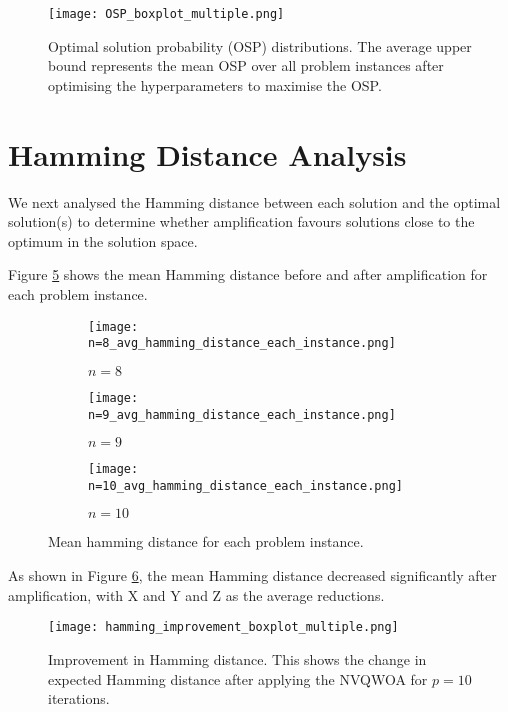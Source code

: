 \begin{figure}[htbp]
    \centering
    \texttt{[image: OSP\_boxplot\_multiple.png]} 
    \caption{Optimal solution probability (OSP) distributions. The average upper bound represents the mean OSP over all problem instances after optimising the hyperparameters to maximise the OSP.}
    \label{fig:osp}
\end{figure}



\section{Hamming Distance Analysis}
We next analysed the Hamming distance between each solution and the optimal solution(s) to determine whether amplification favours solutions close to the optimum in the solution space.

Figure \ref{fig:avg ham} shows the mean Hamming distance before and after amplification for each problem instance.
\begin{figure}[htbp]
     \centering
     \begin{subfigure}{0.45\textwidth}
         \centering
         \texttt{[image: n=8\_avg\_hamming\_distance\_each\_instance.png]}
         \caption{$n=8$}
         \label{fig:avg ham 8}
     \end{subfigure}
     \hfill
     \begin{subfigure}{0.45\textwidth}
         \centering
         \texttt{[image: n=9\_avg\_hamming\_distance\_each\_instance.png]}
         \caption{$n=9$}
         \label{fig:avg ham 9}
     \end{subfigure}
     \hfill
     \begin{subfigure}{\textwidth}
         \centering
         \texttt{[image: n=10\_avg\_hamming\_distance\_each\_instance.png]}
         \caption{$n=10$}
         \label{fig:avg ham 10}
     \end{subfigure}
        \caption{Mean hamming distance for each problem instance.}
        \label{fig:avg ham}
\end{figure}

As shown in Figure \ref{fig:ham improvement}, the mean Hamming distance decreased significantly after amplification, with X and Y and Z as the average reductions.
\begin{figure}[htbp]
    \centering
    \texttt{[image: hamming\_improvement\_boxplot\_multiple.png]}
    \caption{Improvement in Hamming distance. This shows the change in expected Hamming distance after applying the NVQWOA for $p=10$ iterations.}
    \label{fig:ham improvement}
\end{figure}

